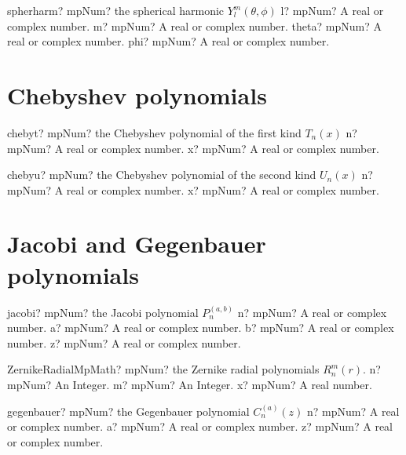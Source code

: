 \documentclass[12pt,a4paper,openany]{book}
\begin{document}
\begin{mpFunctionsExtract}
\mpFunctionFour
{spherharm? mpNum? the spherical harmonic $Y_l^m(\theta,\phi)$}
{l? mpNum? A real or complex number.}
{m? mpNum? A real or complex number.}
{theta? mpNum? A real or complex number.}
{phi? mpNum? A real or complex number.}
\end{mpFunctionsExtract}

\section{Chebyshev polynomials}

\begin{mpFunctionsExtract}
\mpFunctionTwo
{chebyt? mpNum? the Chebyshev polynomial of the first kind $T_n(x)$}
{n? mpNum? A real or complex number.}
{x? mpNum? A real or complex number.}
\end{mpFunctionsExtract}

\begin{mpFunctionsExtract}
\mpFunctionTwo
{chebyu? mpNum? the Chebyshev polynomial of the second kind $U_n(x)$}
{n? mpNum? A real or complex number.}
{x? mpNum? A real or complex number.}
\end{mpFunctionsExtract}

\section{Jacobi and Gegenbauer polynomials}

\begin{mpFunctionsExtract}
\mpFunctionFour
{jacobi? mpNum? the Jacobi polynomial $P_n^{(a,b)}$}
{n? mpNum? A real or complex number.}
{a? mpNum? A real or complex number.}
{b? mpNum? A real or complex number.}
{z? mpNum? A real or complex number.}
\end{mpFunctionsExtract}

\begin{mpFunctionsExtract}
\mpFunctionThreeNotImplemented
{ZernikeRadialMpMath? mpNum? the Zernike radial polynomials $R^m_n(r)$.}
{n? mpNum? An Integer.}
{m? mpNum? An Integer.}
{x? mpNum? A real number.}
\end{mpFunctionsExtract}

\begin{mpFunctionsExtract}
\mpFunctionThree
{gegenbauer? mpNum? the Gegenbauer polynomial $C_n^{(a)}(z)$}
{n? mpNum? A real or complex number.}
{a? mpNum? A real or complex number.}
{z? mpNum? A real or complex number.}
\end{mpFunctionsExtract}
\end{document}
